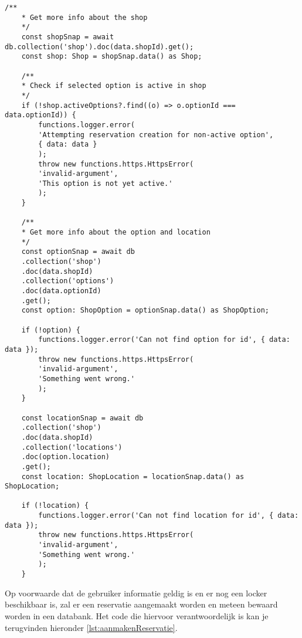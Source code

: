 \begin{lstlisting}[caption={Het informatie ophalen van de geselecteerde locatie. Aan de hand van geselecteerde evenement kan er gegevens uit de databank gehaald worden.}, label={lst:ophalenEventInfo}]
    /**
    * Get more info about the shop
    */
    const shopSnap = await db.collection('shop').doc(data.shopId).get();
    const shop: Shop = shopSnap.data() as Shop;
    
    /**
    * Check if selected option is active in shop
    */
    if (!shop.activeOptions?.find((o) => o.optionId === data.optionId)) {
        functions.logger.error(
        'Attempting reservation creation for non-active option',
        { data: data }
        );
        throw new functions.https.HttpsError(
        'invalid-argument',
        'This option is not yet active.'
        );
    }
    
    /**
    * Get more info about the option and location
    */
    const optionSnap = await db
    .collection('shop')
    .doc(data.shopId)
    .collection('options')
    .doc(data.optionId)
    .get();
    const option: ShopOption = optionSnap.data() as ShopOption;
    
    if (!option) {
        functions.logger.error('Can not find option for id', { data: data });
        throw new functions.https.HttpsError(
        'invalid-argument',
        'Something went wrong.'
        );
    }
    
    const locationSnap = await db
    .collection('shop')
    .doc(data.shopId)
    .collection('locations')
    .doc(option.location)
    .get();
    const location: ShopLocation = locationSnap.data() as ShopLocation;
    
    if (!location) {
        functions.logger.error('Can not find location for id', { data: data });
        throw new functions.https.HttpsError(
        'invalid-argument',
        'Something went wrong.'
        );
    }
\end{lstlisting}

Op voorwaarde dat de gebruiker informatie geldig is en er nog een locker beschikbaar is, zal er een reservatie aangemaakt worden en meteen bewaard worden in een databank. Het code die hiervoor verantwoordelijk is kan je terugvinden hieronder \ref{lst:aanmakenReservatie}.

